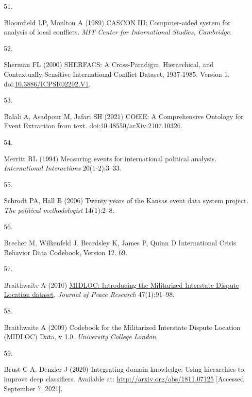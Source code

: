 \documentclass{article}
\newlength{\cslhangindent}
\newlength{\csllabelwidth}
\newlength{\cslentryspacingunit} %
\newenvironment{CSLReferences}[2] %
 {%
  \setlength{\parindent}{0pt}
  \ifodd #1
  \let\oldpar\par
  \def\par{\hangindent=\cslhangindent\oldpar}
  \fi
  \setlength{\parskip}{#2\cslentryspacingunit}
 }%
 {}
\newcommand{\CSLLeftMargin}[1]{\parbox[t]{\csllabelwidth}{#1}}
\newcommand{\CSLRightInline}[1]{\parbox[t]{\linewidth - \csllabelwidth}{#1}\break}
\begin{document}
\begin{CSLReferences}{0}{0}
\leavevmode{}%
\CSLLeftMargin{51. }
\CSLRightInline{Bloomfield LP, Moulton A (1989) {CASCON III}:
{Computer-aided} system for analysis of local conflicts. \emph{MIT
Center for International Studies, Cambridge}.}

\leavevmode{}%
\CSLLeftMargin{52. }
\CSLRightInline{Sherman FL (2000) {SHERFACS}: {A Cross-Paradigm},
{Hierarchical}, and {Contextually-Sensitive International Conflict
Dataset}, 1937-1985: {Version} 1.
doi:\href{https://doi.org/10.3886/ICPSR02292.V1}{10.3886/ICPSR02292.V1}.}

\leavevmode{}%
\CSLLeftMargin{53. }
\CSLRightInline{Balali A, Asadpour M, Jafari SH (2021) {COfEE}: {A
Comprehensive Ontology} for {Event Extraction} from text.
doi:\href{https://doi.org/10.48550/arXiv.2107.10326}{10.48550/arXiv.2107.10326}.}

\leavevmode{}%
\CSLLeftMargin{54. }
\CSLRightInline{Merritt RL (1994) Measuring events for international
political analysis. \emph{International Interactions} 20(1-2):3--33.}

\leavevmode{}%
\CSLLeftMargin{55. }
\CSLRightInline{Schrodt PA, Hall B (2006) Twenty years of the {Kansas}
event data system project. \emph{The political methodologist}
14(1):2--8.}

\leavevmode{}%
\CSLLeftMargin{56. }
\CSLRightInline{Brecher M, Wilkenfeld J, Beardsley K, James P, Quinn D
International {Crisis Behavior Data Codebook}, {Version} 12. 69.}

\leavevmode{}%
\CSLLeftMargin{57. }
\CSLRightInline{Braithwaite A (2010)
\href{https://doi.org/10.1177/0022343309350008}{{MIDLOC}: {Introducing}
the {Militarized Interstate Dispute Location} dataset}. \emph{Journal of
Peace Research} 47(1):91--98.}

\leavevmode{}%
\CSLLeftMargin{58. }
\CSLRightInline{Braithwaite A (2009) Codebook for the {Militarized
Interstate Dispute Location} ({MIDLOC}) {Data}, v 1.0. \emph{University
College London}.}

\leavevmode{}%
\CSLLeftMargin{59. }
\CSLRightInline{Brust C-A, Denzler J (2020) Integrating domain
knowledge: Using hierarchies to improve deep classifiers. Available at:
\url{http://arxiv.org/abs/1811.07125} {[}Accessed September 7, 2021{]}.}


\end{CSLReferences}
\end{document}
